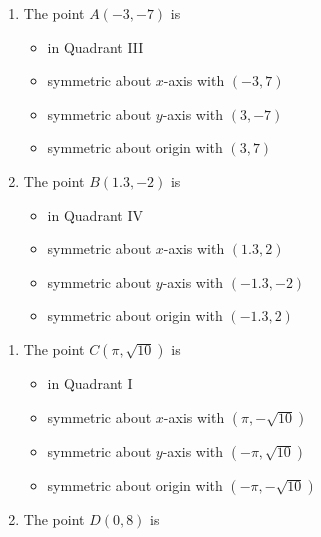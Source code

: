 \begin{enumerate}
\begin{multicols}{2}
\begin{enumerate}

\item The point $A(-3, -7)$ is 

\begin{itemize}

\item in Quadrant III
\item symmetric about $x$-axis with $(-3, 7)$
\item symmetric about $y$-axis with $(3, -7)$
\item symmetric about origin with $(3, 7)$

\end{itemize}

\item The point $B(1.3, -2)$ is 

\begin{itemize}

\item in Quadrant IV
\item symmetric about $x$-axis with $(1.3, 2)$
\item symmetric about $y$-axis with $(-1.3, -2)$
\item symmetric about origin with $(-1.3, 2)$

\end{itemize}

\setcounter{HWindent}{\value{enumii}}
\end{enumerate}
\end{multicols}

\begin{multicols}{2}
\begin{enumerate}
\setcounter{enumii}{\value{HWindent}}

\item The point $C(\pi, \sqrt{10})$ is 

\begin{itemize}

\item in Quadrant I
\item symmetric about $x$-axis with {\small $(\pi, -\sqrt{10})$}
\item symmetric about $y$-axis with {\small $(-\pi, \sqrt{10})$}
\item symmetric about origin with {\scriptsize $(-\pi, -\sqrt{10})$}

\end{itemize}

\item The point $D(0, 8)$ is 


\end{enumerate}
\end{multicols}
\end{enumerate}

